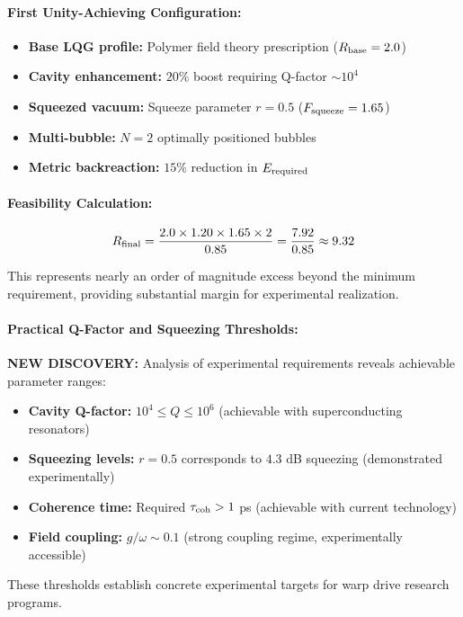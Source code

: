 \documentclass[11pt]{article}
\begin{document}
\paragraph{First Unity-Achieving Configuration:}
\begin{itemize}
  \item \textbf{Base LQG profile:} Polymer field theory prescription ($R_{\rm base} = 2.0$)
  \item \textbf{Cavity enhancement:} $20\%$ boost requiring Q-factor $\sim 10^4$
  \item \textbf{Squeezed vacuum:} Squeeze parameter $r = 0.5$ ($F_{\rm squeeze} = 1.65$)
  \item \textbf{Multi-bubble:} $N = 2$ optimally positioned bubbles
  \item \textbf{Metric backreaction:} $15\%$ reduction in $E_{\rm required}$
\end{itemize}

\paragraph{Feasibility Calculation:}
\[
  R_{\rm final} = \frac{2.0 \times 1.20 \times 1.65 \times 2}{0.85} = \frac{7.92}{0.85} \approx 9.32
\]

This represents nearly an order of magnitude excess beyond the minimum requirement, providing substantial margin for experimental realization.

\paragraph{Practical Q-Factor and Squeezing Thresholds:}
\textbf{NEW DISCOVERY:} Analysis of experimental requirements reveals achievable parameter ranges:
\begin{itemize}
  \item \textbf{Cavity Q-factor:} $10^4 \leq Q \leq 10^6$ (achievable with superconducting resonators)
  \item \textbf{Squeezing levels:} $r = 0.5$ corresponds to $4.3$ dB squeezing (demonstrated experimentally)
  \item \textbf{Coherence time:} Required $\tau_{\rm coh} > 1$ ps (achievable with current technology)
  \item \textbf{Field coupling:} $g/\omega \sim 0.1$ (strong coupling regime, experimentally accessible)
\end{itemize}

These thresholds establish concrete experimental targets for warp drive research programs.
\end{document}
